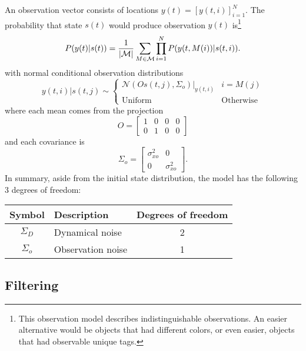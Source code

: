 \documentclass[12pt]{article}
\newcommand{\NormalE}[3]{{\mathcal{N}}\left.\left(#1,#2\right)\right|_{#3}}
\newcommand{\M}{{\cal M}}
\newcommand{\os}[4]{{\left[ #1(#2) \right]}_{#3}^{#4}} %
\newcommand{\ti}[2]{{#1}{(#2)}}                         %
\begin{document}
An observation vector consists of locations
$\ti{y}{t}=\os{y}{t,i}{i=1}{N}$.  The probability that state
$\ti{s}{t}$ would produce observation $\ti{y}{t}$ is\footnote{This
  observation model describes indistinguishable observations.  An
  easier alternative would be objects that had different colors, or
  even easier, objects that had observable unique tags.}
\begin{equation}
  \label{eq:ob}
  P(\ti{y}{t}|\ti{s}{t}) =
    \frac{1}{\left|\M \right|} \sum_{M \in \M}
    \prod_{i=1}^{N} P(\ti{y}{t,M(i)}|\ti{s}{t,i}).
\end{equation}
with normal conditional observation distributions
\begin{equation*}
  \ti{y}{t,i}|\ti{s}{t,j} \sim
  \begin{cases}
    \NormalE{O\ti{s}{t,j}}{\Sigma_o}{\ti{y}{t,i}} & i = M(j) \\
    \text{Uniform} & \text{Otherwise}
  \end{cases}
\end{equation*}
where each mean comes from the projection
\begin{equation*}
  O = \begin{bmatrix} 1 & 0 & 0 & 0\\
    0 & 1 & 0 & 0 \end{bmatrix}
\end{equation*}
and each covariance is
\begin{equation*}
  \Sigma_o = \begin{bmatrix} \sigma_{xo}^2 & 0 \\ 0 &
    \sigma_{xo}^2 \end{bmatrix}.
\end{equation*}
In summary, aside from the initial state distribution, the model has
the following 3 degrees of freedom:
\begin{center}
  \begin{tabular}{|cp{15em}c|}
    \hline
    Symbol & Description & Degrees of freedom \\
    \hline
    $\Sigma_D$ & Dynamical noise & 2 \\
    $\Sigma_o$ & Observation noise & 1 \\
    \hline
  \end{tabular} 
\end{center}

\subsection{Filtering}
\label{sec:filter1}
\end{document}
